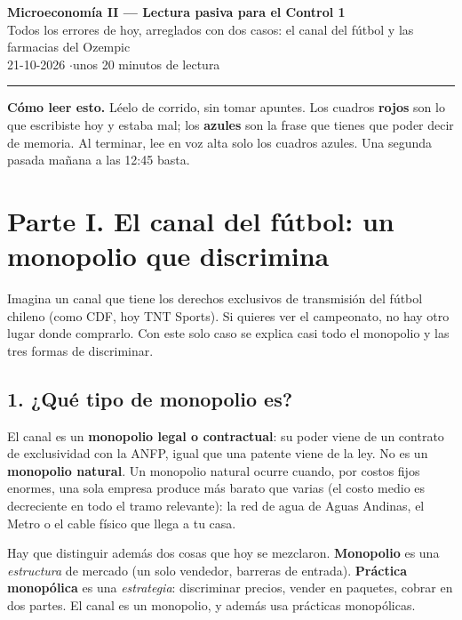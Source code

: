 \documentclass[11pt]{article}
\begin{document}
\begin{center}
{\Large\bfseries Microeconomía II --- Lectura pasiva para el Control 1}\\[4pt]
{\large Todos los errores de hoy, arreglados con dos casos: el canal del fútbol y las farmacias del Ozempic}\\[4pt]
21-10-2026 \quad$\cdot$\quad unos 20 minutos de lectura
\end{center}

\hrule
\medskip

\textbf{Cómo leer esto.} Léelo de corrido, sin tomar apuntes. Los cuadros \textcolor{red!60!black}{\textbf{rojos}} son lo que escribiste hoy y estaba mal; los \textcolor{blue!50!black}{\textbf{azules}} son la frase que tienes que poder decir de memoria. Al terminar, lee en voz alta solo los cuadros azules. Una segunda pasada mañana a las 12:45 basta.

\section*{Parte I. El canal del fútbol: un monopolio que discrimina}

Imagina un canal que tiene los derechos exclusivos de transmisión del fútbol chileno (como CDF, hoy TNT Sports). Si quieres ver el campeonato, no hay otro lugar donde comprarlo. Con este solo caso se explica casi todo el monopolio y las tres formas de discriminar.

\subsection*{1. ¿Qué tipo de monopolio es?}

El canal es un \textbf{monopolio legal o contractual}: su poder viene de un contrato de exclusividad con la ANFP, igual que una patente viene de la ley. No es un \textbf{monopolio natural}. Un monopolio natural ocurre cuando, por costos fijos enormes, una sola empresa produce más barato que varias (el costo medio es decreciente en todo el tramo relevante): la red de agua de Aguas Andinas, el Metro o el cable físico que llega a tu casa.

Hay que distinguir además dos cosas que hoy se mezclaron. \textbf{Monopolio} es una \emph{estructura} de mercado (un solo vendedor, barreras de entrada). \textbf{Práctica monopólica} es una \emph{estrategia}: discriminar precios, vender en paquetes, cobrar en dos partes. El canal es un monopolio, y además usa prácticas monopólicas.
\end{document}
